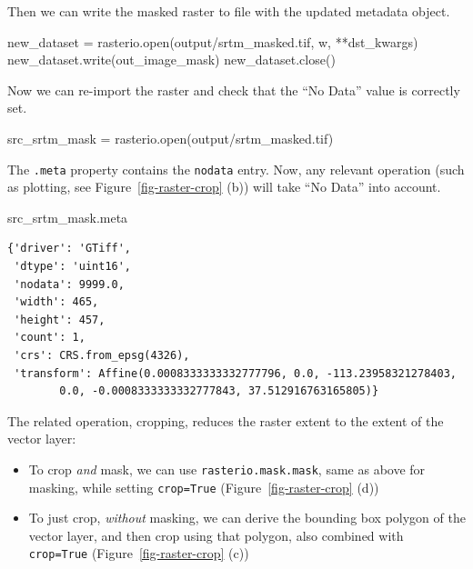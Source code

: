 \documentclass[
  letterpaper,
]{krantz}
\newenvironment{Shaded}{\begin{snugshade}}{\end{snugshade}}
\newcommand{\BuiltInTok}[1]{\textcolor[rgb]{0.00,0.23,0.31}{#1}}
\newcommand{\NormalTok}[1]{\textcolor[rgb]{0.00,0.23,0.31}{#1}}
\newcommand{\OperatorTok}[1]{\textcolor[rgb]{0.37,0.37,0.37}{#1}}
\newcommand{\StringTok}[1]{\textcolor[rgb]{0.13,0.47,0.30}{#1}}
\providecommand{\tightlist}{%
  \setlength{\itemsep}{0pt}\setlength{\parskip}{0pt}}\usepackage{longtable,booktabs,array}
\begin{document}
Then we can write the masked raster to file with the updated metadata
object.

\begin{Shaded}
\begin{Highlighting}[]
\NormalTok{new\_dataset }\OperatorTok{=}\NormalTok{ rasterio.}\BuiltInTok{open}\NormalTok{(}\StringTok{\textquotesingle{}output/srtm\_masked.tif\textquotesingle{}}\NormalTok{, }\StringTok{\textquotesingle{}w\textquotesingle{}}\NormalTok{, }\OperatorTok{**}\NormalTok{dst\_kwargs)}
\NormalTok{new\_dataset.write(out\_image\_mask)}
\NormalTok{new\_dataset.close()}
\end{Highlighting}
\end{Shaded}

Now we can re-import the raster and check that the ``No Data'' value is
correctly set.

\begin{Shaded}
\begin{Highlighting}[]
\NormalTok{src\_srtm\_mask }\OperatorTok{=}\NormalTok{ rasterio.}\BuiltInTok{open}\NormalTok{(}\StringTok{\textquotesingle{}output/srtm\_masked.tif\textquotesingle{}}\NormalTok{)}
\end{Highlighting}
\end{Shaded}

The \texttt{.meta} property contains the \texttt{nodata} entry. Now, any
relevant operation (such as plotting, see Figure~\ref{fig-raster-crop}
(b)) will take ``No Data'' into account.

\begin{Shaded}
\begin{Highlighting}[]
\NormalTok{src\_srtm\_mask.meta}
\end{Highlighting}
\end{Shaded}

\begin{verbatim}
{'driver': 'GTiff',
 'dtype': 'uint16',
 'nodata': 9999.0,
 'width': 465,
 'height': 457,
 'count': 1,
 'crs': CRS.from_epsg(4326),
 'transform': Affine(0.0008333333332777796, 0.0, -113.23958321278403,
        0.0, -0.0008333333332777843, 37.512916763165805)}
\end{verbatim}

The related operation, cropping, reduces the raster extent to the extent
of the vector layer:

\begin{itemize}
\tightlist
\item
  To crop \emph{and} mask, we can use \texttt{rasterio.mask.mask}, same
  as above for masking, while setting \texttt{crop=True}
  (Figure~\ref{fig-raster-crop} (d))
\item
  To just crop, \emph{without} masking, we can derive the bounding box
  polygon of the vector layer, and then crop using that polygon, also
  combined with \texttt{crop=True} (Figure~\ref{fig-raster-crop} (c))
\end{itemize}
\end{document}
